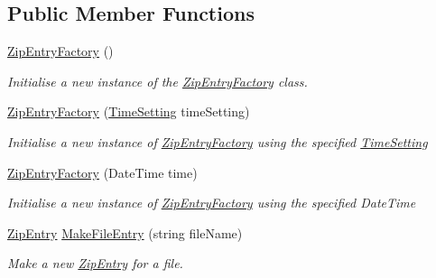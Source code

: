\subsection*{Public Member Functions}
\begin{DoxyCompactItemize}
\item 
\hyperlink{class_i_c_sharp_code_1_1_sharp_zip_lib_1_1_zip_1_1_zip_entry_factory_a4f6d10d8c71de0dc3a589be945b216a9}{Zip\+Entry\+Factory} ()
\begin{DoxyCompactList}\small\item\em Initialise a new instance of the \hyperlink{class_i_c_sharp_code_1_1_sharp_zip_lib_1_1_zip_1_1_zip_entry_factory}{Zip\+Entry\+Factory} class. \end{DoxyCompactList}\item 
\hyperlink{class_i_c_sharp_code_1_1_sharp_zip_lib_1_1_zip_1_1_zip_entry_factory_a12305111b7b339c6fa74995a0f580870}{Zip\+Entry\+Factory} (\hyperlink{class_i_c_sharp_code_1_1_sharp_zip_lib_1_1_zip_1_1_zip_entry_factory_a10d0f2a1e64abd09ea6abac4d34a9955}{Time\+Setting} time\+Setting)
\begin{DoxyCompactList}\small\item\em Initialise a new instance of \hyperlink{class_i_c_sharp_code_1_1_sharp_zip_lib_1_1_zip_1_1_zip_entry_factory}{Zip\+Entry\+Factory} using the specified \hyperlink{class_i_c_sharp_code_1_1_sharp_zip_lib_1_1_zip_1_1_zip_entry_factory_a10d0f2a1e64abd09ea6abac4d34a9955}{Time\+Setting} \end{DoxyCompactList}\item 
\hyperlink{class_i_c_sharp_code_1_1_sharp_zip_lib_1_1_zip_1_1_zip_entry_factory_a1712f61a0640060a85a7f9aa56935116}{Zip\+Entry\+Factory} (Date\+Time time)
\begin{DoxyCompactList}\small\item\em Initialise a new instance of \hyperlink{class_i_c_sharp_code_1_1_sharp_zip_lib_1_1_zip_1_1_zip_entry_factory}{Zip\+Entry\+Factory} using the specified Date\+Time \end{DoxyCompactList}\item 
\hyperlink{class_i_c_sharp_code_1_1_sharp_zip_lib_1_1_zip_1_1_zip_entry}{Zip\+Entry} \hyperlink{class_i_c_sharp_code_1_1_sharp_zip_lib_1_1_zip_1_1_zip_entry_factory_a29a2abb7d5c0bea2ac1c82a2d7da7075}{Make\+File\+Entry} (string file\+Name)
\begin{DoxyCompactList}\small\item\em Make a new \hyperlink{class_i_c_sharp_code_1_1_sharp_zip_lib_1_1_zip_1_1_zip_entry}{Zip\+Entry} for a file. \end{DoxyCompactList}\item 

\end{DoxyCompactItemize}
